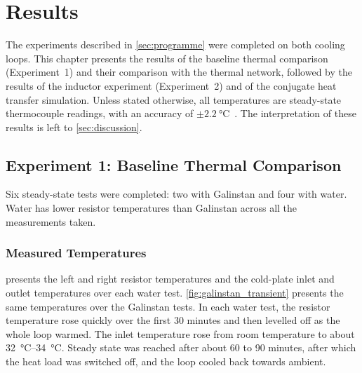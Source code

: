 \chapter{Results}
\label{ch:results}

The experiments described in \cref{sec:programme} were completed on both cooling
loops. This chapter presents the results of the baseline thermal comparison
(Experiment~1) and their comparison with the thermal network, followed by the
results of the inductor experiment (Experiment~2) and of the conjugate heat
transfer simulation. Unless stated otherwise, all temperatures are steady-state
thermocouple readings, with an accuracy of
$\pm\SI{2.2}{\celsius}$~\cite{loh_project_2025}. The interpretation of these
results is left to \cref{sec:discussion}.

\section{Experiment 1: Baseline Thermal Comparison}
\label{sec:results-exp1}

Six steady-state tests were completed: two with Galinstan and four with water.
Water has lower resistor temperatures than Galinstan across all the measurements taken.




\subsection{Measured Temperatures}
\label{sec:results-measured}

 presents the left and right resistor temperatures and
the cold-plate inlet and outlet temperatures over each water test.
\cref{fig:galinstan_transient} presents the same temperatures over the Galinstan
tests. In each water test, the resistor temperature rose quickly over the first
30 minutes and then levelled off as the whole loop warmed. The inlet
temperature rose from room temperature to about
\SIrange{32}{34}{\celsius}. Steady state was reached after about 60 to 90
minutes, after which the heat load was switched off, and the loop cooled back
towards ambient.

